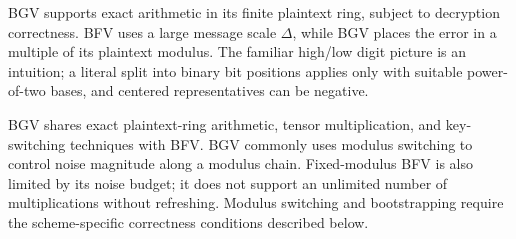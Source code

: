 BGV supports exact arithmetic in its finite plaintext ring, subject to decryption correctness. BFV uses a large message scale $\Delta$, while BGV places the error in a multiple of its plaintext modulus. The familiar high/low digit picture is an intuition; a literal split into binary bit positions applies only with suitable power-of-two bases, and centered representatives can be negative.

BGV shares exact plaintext-ring arithmetic, tensor multiplication, and key-switching techniques with BFV. BGV commonly uses modulus switching to control noise magnitude along a modulus chain. Fixed-modulus BFV is also limited by its noise budget; it does not support an unlimited number of multiplications without refreshing. Modulus switching and bootstrapping require the scheme-specific correctness conditions described below.



